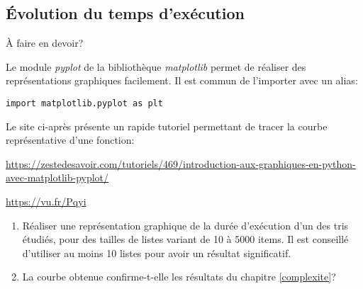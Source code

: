\documentclass[a4paper,11pt]{article}
\begin{document}
\begin{Form}
\subsection{Évolution du temps d'exécution}
\begin{commentprof}
À faire en devoir?
\end{commentprof}
Le module \emph{pyplot} de la bibliothèque \emph{matplotlib} permet de réaliser des représentations graphiques facilement. Il est commun de l'importer avec un alias:
\begin{lstlisting}
import matplotlib.pyplot as plt
\end{lstlisting}
Le site ci-après présente un rapide tutoriel permettant de tracer la courbe représentative d'une fonction:
\begin{center}
\begin{commentprof}
\url{https://zestedesavoir.com/tutoriels/469/introduction-aux-graphiques-en-python-avec-matplotlib-pyplot/}
\end{commentprof}
\url{https://vu.fr/Pqyi}
\end{center}
\begin{activite}
\begin{enumerate}
\item Réaliser une représentation graphique de la durée d'exécution d'un des tris étudiés, pour des tailles de listes variant de 10 à 5000 items. Il est conseillé d'utiliser au moins 10 listes pour avoir un résultat significatif.
\item La courbe obtenue confirme-t-elle les résultats du chapitre \ref{complexite}?
\end{enumerate}
\end{activite}
\end{Form}
\end{document}
